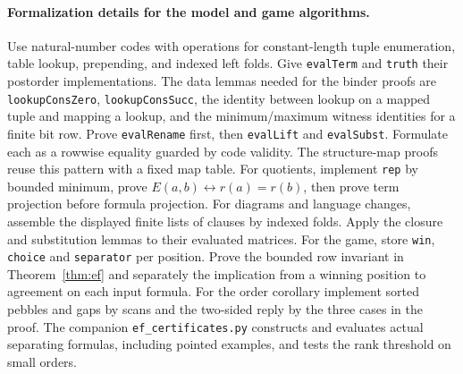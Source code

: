 \paragraph{Formalization details for the model and game algorithms.}
Use natural-number codes with operations for constant-length tuple enumeration, table lookup, prepending, and indexed left folds. Give \texttt{evalTerm} and \texttt{truth} their postorder implementations. The data lemmas needed for the binder proofs are \texttt{lookupConsZero}, \texttt{lookupConsSucc}, the identity between lookup on a mapped tuple and mapping a lookup, and the minimum/maximum witness identities for a finite bit row. Prove \texttt{evalRename} first, then \texttt{evalLift} and \texttt{evalSubst}. Formulate each as a rowwise equality guarded by code validity. The structure-map proofs reuse this pattern with a fixed map table. For quotients, implement \texttt{rep} by bounded minimum, prove $E(a,b)\leftrightarrow r(a)=r(b)$, then prove term projection before formula projection. For diagrams and language changes, assemble the displayed finite lists of clauses by indexed folds. Apply the closure and substitution lemmas to their evaluated matrices. For the game, store \texttt{win}, \texttt{choice} and \texttt{separator} per position. Prove the bounded row invariant in Theorem~\ref{thm:ef} and separately the implication from a winning position to agreement on each input formula. For the order corollary implement sorted pebbles and gaps by scans and the two-sided reply by the three cases in the proof. The companion \texttt{ef\_certificates.py} constructs and evaluates actual separating formulas, including pointed examples, and tests the rank threshold on small orders.
